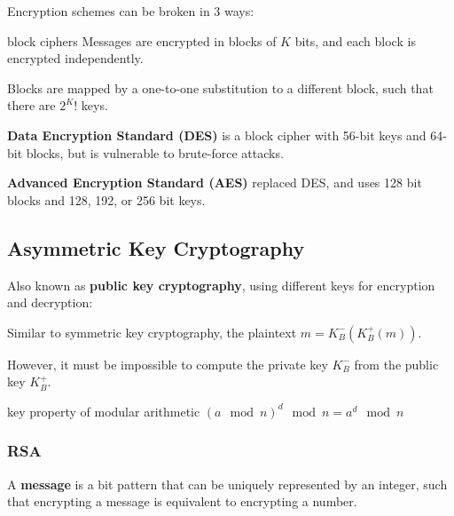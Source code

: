 Encryption schemes can be broken in 3 ways:
\begin{enumerate}
\end{enumerate}

\begin{defn}{block ciphers}
    Messages are encrypted in blocks of $K$ bits, and each block is encrypted independently.

    Blocks are mapped by a one-to-one substitution to a different block, such that there are $2^K!$ keys.
\end{defn}

\textbf{Data Encryption Standard (DES)} is a block cipher with 56-bit keys and 64-bit blocks,
but is vulnerable to brute-force attacks.
 
\textbf{Advanced Encryption Standard (AES)} replaced DES, and uses 128 bit blocks and 128, 192, or 256 bit keys.

\subsection{Asymmetric Key Cryptography}
Also known as \textbf{public key cryptography}, using different keys for encryption and decryption:

\begin{itemize}
\end{itemize}

Similar to symmetric key cryptography, the plaintext $m = K_B^-(K_B^+(m))$.

However, it must be impossible to compute the private key $K_B^-$ from the public key $K_B^+$.

\begin{defn}{key property of modular arithmetic}
    $(a \mod{n})^d \mod{n} = a^d \mod{n}$
\end{defn}

\subsubsection{RSA}
A \textbf{message} is a bit pattern that can be uniquely represented by an integer,
such that encrypting a message is equivalent to encrypting a number.

